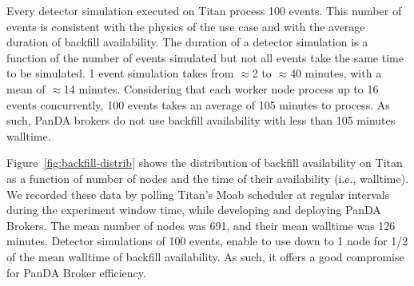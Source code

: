 Every detector simulation executed on Titan process 100 events. This number of
events is consistent with the physics of the use case and with the average
duration of backfill availability. The duration of a detector simulation is a
function of the number of events simulated but not all events take the same time
to be simulated. 1 event simulation takes from $\approx$2 to $\approx$40
minutes, with a mean of $\approx$14 minutes. Considering that each worker node
process up to 16 events concurrently, 100 events takes an average of 105 minutes
to process. As such, PanDA brokers do not use backfill availability with less
than 105 minutes walltime.



Figure~\ref{fig:backfill-distrib} shows the distribution of backfill
availability on Titan as a function of number of nodes and the time of their
availability (i.e., walltime). We recorded these data by polling Titan's Moab
scheduler at regular intervals during the experiment window time, while
developing and deploying PanDA Brokers. The mean number of nodes was 691, and
their mean walltime was 126 minutes. Detector simulations of 100 events, enable
to use down to 1 node for 1/2 of the mean walltime of backfill availability. As
such, it offers a good compromise for PanDA Broker efficiency.

